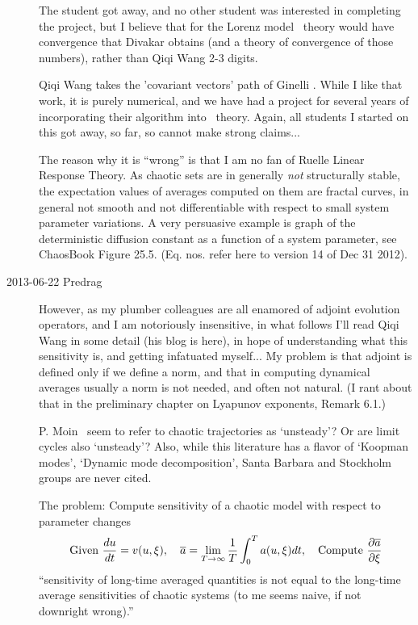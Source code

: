 \begin{description}
The student got away, and no other student was interested in
completing the project, but I believe that for the Lorenz model \po\
theory would have convergence that Divakar obtains (and a
theory of convergence of those numbers), rather than Qiqi
Wang 2-3 digits.

Qiqi Wang takes the 'covariant vectors' path of
Ginelli \etal\rf{ginelli-2007-99}. While I like that work, it is
purely numerical, and we have had a project for several years of
incorporating their algorithm into \po\ theory. Again, all students I
started on this got away, so far, so cannot make strong claims...

The reason why it is ``wrong'' is that I am no fan of
Ruelle Linear Response Theory. As chaotic sets
are in generally \emph{not} structurally stable, the expectation
values of averages computed on them are fractal curves, in general
not smooth and not differentiable with respect to small system
parameter variations.
A very persuasive example is graph of the deterministic diffusion
constant as a function of a system parameter, see ChaosBook
Figure 25.5. (Eq. nos. refer here to
 {version 14} of Dec
31 2012).

\item[2013-06-22 Predrag]
However, as my plumber colleagues are all enamored of adjoint
evolution operators, and I am notoriously insensitive,
in what follows I'll
read Qiqi Wang in some detail (his blog is
 {here}), in hope of understanding
what this sensitivity is, and
getting infatuated myself... My problem is that adjoint is defined
only if we define a norm, and that in computing dynamical averages
usually a norm is not needed, and often not natural. (I rant about that
in the preliminary chapter on
 {Lyapunov exponents},
Remark 6.1.)

                                        \toCB
P. Moin \etal\ seem to refer to chaotic trajectories as `unsteady'?
Or are limit cycles also `unsteady'? Also, while this literature has
a flavor of `Koopman modes', `Dynamic mode decomposition', Santa
Barbara and Stockholm groups are never cited.

The problem: Compute sensitivity of a chaotic
model with respect to parameter changes
\begin{equation}
\mbox{Given } \frac{du}{dt} = v(u, \xi), \quad
\overline{a} = \lim_{T\rightarrow\infty} \frac1T \int_0^T a(u,\xi)
dt,\quad
\mbox{Compute } \frac{\partial \overline{a}}{\partial \xi}
\label{e:gen_problem}
\end{equation}
``sensitivity of long-time averaged quantities is not equal to the long-time average sensitivities of chaotic systems (to me 
seems naive, if not downright wrong).''



\end{description}

